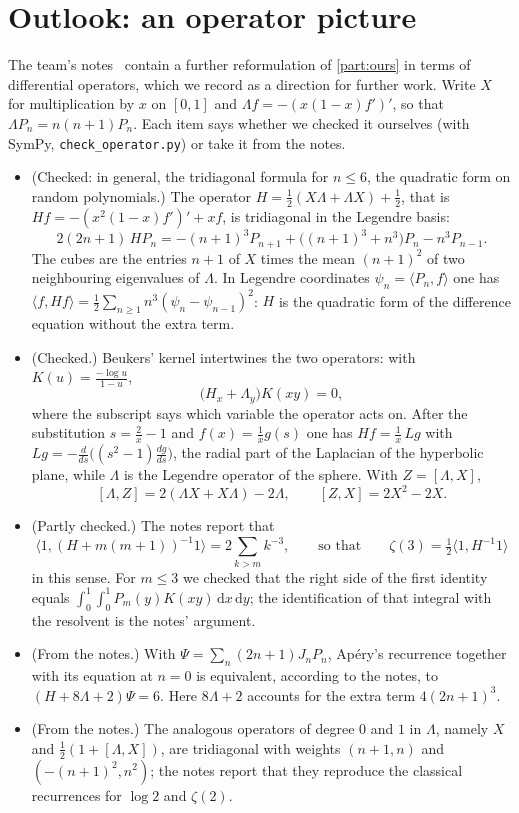\documentclass[11pt]{article}
\newcommand{\dd}{\,\mathrm{d}}
\theoremstyle{plain}
\theoremstyle{definition}
\theoremstyle{remark}
\begin{document}
\section{Outlook: an operator picture}\label{sec:operator}

The team's notes~\cite{opnotes} contain a further reformulation of \cref{part:ours} in terms of differential
operators, which we record as a direction for further work. Write $X$ for multiplication by $x$ on
$[0,1]$ and $\Lambda f=-(x(1-x)f')'$, so that $\Lambda P_n=n(n+1)P_n$. Each item says whether we
checked it ourselves (with SymPy, \texttt{check\_operator.py}) or take it from the notes.
\begin{itemize}
  \item (Checked: in general, the tridiagonal formula for $n\le6$, the quadratic form on random
    polynomials.) The operator $H=\frac12(X\Lambda+\Lambda X)+\frac12$, that is $Hf=-(x^2(1-x)f')'+xf$, is tridiagonal in
    the Legendre basis:
    \[
      2(2n+1)\,HP_n=-(n+1)^3P_{n+1}+\bigl((n+1)^3+n^3\bigr)P_n-n^3P_{n-1}.
    \]
    The cubes are the entries $n+1$ of $X$ times the mean $(n+1)^2$ of two neighbouring eigenvalues
    of $\Lambda$. In Legendre coordinates $\psi_n=\langle P_n,f\rangle$ one has
    $\langle f,Hf\rangle=\frac12\sum_{n\ge1}n^3(\psi_n-\psi_{n-1})^2$: $H$ is the quadratic form of the
    difference equation without the extra term.
  \item (Checked.) Beukers' kernel intertwines the two operators: with $K(u)=\frac{-\log u}{1-u}$,
    \[
      \bigl(H_x+\Lambda_y\bigr)K(xy)=0,
    \]
    where the subscript says which variable the operator acts on. After the substitution
    $s=\frac2x-1$ and $f(x)=\frac1xg(s)$ one has $Hf=\frac1x\,Lg$ with
    $Lg=-\frac{d}{ds}\bigl((s^2-1)\frac{dg}{ds}\bigr)$, the radial part of the Laplacian of the
    hyperbolic plane, while $\Lambda$ is the Legendre operator of the sphere. With $Z=[\Lambda,X]$,
    \[
      [\Lambda,Z]=2(\Lambda X+X\Lambda)-2\Lambda,\qquad [Z,X]=2X^2-2X .
    \]
  \item (Partly checked.) The notes report that
    \[\langle1,(H+m(m+1))^{-1}1\rangle=2\sum_{k>m}k^{-3},\qquad\text{so that}\qquad
      \zeta(3)=\tfrac12\langle1,H^{-1}1\rangle\]
    in this sense. For $m\le3$ we checked that the right side of the first identity equals $\int_0^1\!\int_0^1P_m(y)K(xy)\dd x\dd y$; the identification of that
    integral with the resolvent is the notes' argument.
  \item (From the notes.) With $\Psi=\sum_n(2n+1)J_nP_n$, Ap\'ery's recurrence together with its equation at $n=0$ is
    equivalent, according to the notes, to $(H+8\Lambda+2)\Psi=6$. Here $8\Lambda+2$ accounts for the extra term $4(2n+1)^3$.
  \item (From the notes.) The analogous operators of degree $0$ and $1$ in $\Lambda$, namely $X$ and $\frac12(1+[\Lambda,X])$, are
    tridiagonal with weights $(n+1,n)$ and $(-(n+1)^2,n^2)$; the notes report that they reproduce
    the classical recurrences for $\log2$ and $\zeta(2)$.
\end{itemize}
\end{document}
